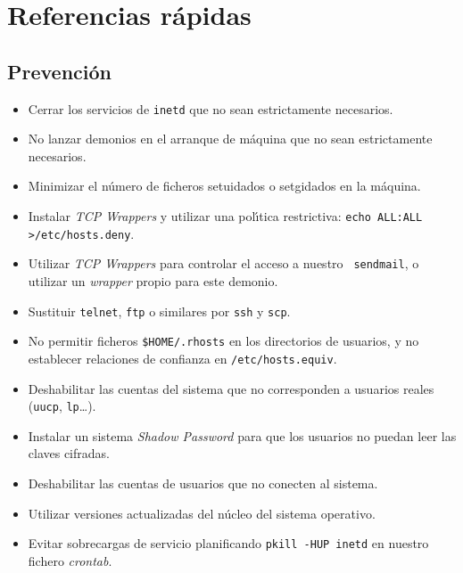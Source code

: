 \section{Referencias r\'apidas}
\subsection{Prevenci\'on}
\begin{itemize}
\item Cerrar los servicios de {\tt inetd} que no sean estrictamente necesarios.
\item No lanzar demonios en el arranque de m\'aquina que no sean estrictamente
necesarios.
\item Minimizar el n\'umero de ficheros setuidados o setgidados en la m\'aquina.
\item Instalar {\it TCP Wrappers} y utilizar una pol\'{\i}tica restrictiva:
{\tt echo ALL:ALL >/etc/hosts.deny}. 
\item Utilizar {\it TCP Wrappers} para controlar el acceso a nuestro {\tt 
sendmail}, o utilizar un {\it wrapper} propio para este demonio.
\item Sustituir {\tt telnet}, {\tt ftp} o similares por {\tt ssh} y {\tt scp}.
\item No permitir ficheros {\tt \$HOME/.rhosts} en los directorios de usuarios,
y no establecer relaciones de confianza en {\tt /etc/hosts.equiv}.
\item Deshabilitar las cuentas del sistema que no corresponden a usuarios 
reales ({\tt uucp}, {\tt lp}\ldots).
\item Instalar un sistema {\it Shadow Password} para que los usuarios no 
puedan leer las claves cifradas. 
\item Deshabilitar las cuentas de usuarios que no conecten al sistema.
\item Utilizar versiones actualizadas del n\'ucleo del sistema operativo.
\item Evitar sobrecargas de servicio planificando {\tt pkill -HUP inetd} en
nuestro fichero {\it crontab}.
\end{itemize}

